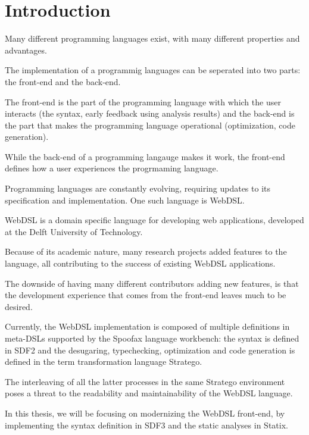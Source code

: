 
\chapter{\label{chap:introduction}Introduction}

  Many different programming languages exist, with many different properties and advantages.

  The implementation of a programmig languages can be seperated into two parts: the front-end and the back-end. 

  The front-end is the part of the programming language with which the user interacts (the syntax, early feedback using analysis results) and the back-end is the part that makes the programming language operational (optimization, code generation).

  While the back-end of a programming langauge makes it work, the front-end defines how a user experiences the progrmaming language. %

  Programming languages are constantly evolving, requiring updates to its specification and implementation. One such language is WebDSL.

  WebDSL is a domain specific language for developing web applications, developed at the Delft University of Technology.

  Because of its academic nature, many research projects added features to the language, all contributing to the success of existing WebDSL applications.

  The downside of having many different contributors adding new features, is that the development experience that comes from the front-end leaves much to be desired. %

  Currently, the WebDSL implementation is composed of multiple definitions in meta-DSLs supported by the Spoofax language workbench: the syntax is defined in SDF2 and the desugaring, typechecking, optimization and code generation is defined in the term transformation language Stratego.

  The interleaving of all the latter processes in the same Stratego environment poses a threat to the readability and maintainability of the WebDSL language.

  In this thesis, we will be focusing on modernizing the WebDSL front-end, by implementing the syntax definition in SDF3 and the static analyses in Statix.

